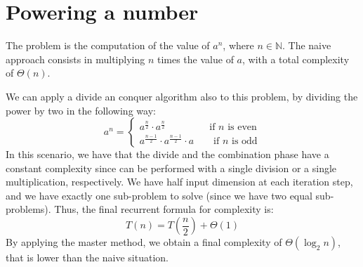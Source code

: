 \section{Powering a number}

The problem is the computation of the value of $a^n$, where $n\in\mathbb{N}$. 
The naive approach consists in multiplying $n$ times the value of $a$, with a total complexity of $\Theta(n)$. 

We can apply a divide an conquer algorithm also to this problem, by dividing the power by two in the following way: 
\[a^n=\begin{cases}
    a^\frac{n}{2}\cdot a^\frac{n}{2}  \:\:\qquad\qquad \text{if }n\text{ is even} \\
    a^\frac{n-1}{2}\cdot a^\frac{n-1}{2} \cdot a \qquad \text{if }n\text{ is odd}
\end{cases}\]
In this scenario, we have that the divide and the combination phase have a constant complexity since can be performed with a single division or a single multiplication, respectively. 
We have half input dimension at each iteration step, and we have exactly one sub-problem to solve (since we have two equal sub-problems). 
Thus, the final recurrent formula for complexity is: 
\[T(n)=T\left(\dfrac{n}{2}\right)+\Theta(1)\]
By applying the master method, we obtain a final complexity of $\Theta(\log_2n)$, that is lower than the naive situation. 